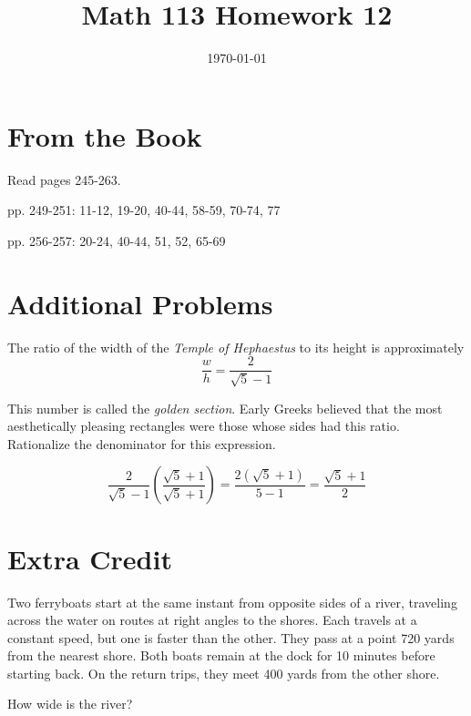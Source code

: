 \documentclass[fleqn,addpoints]{exam}
\title{Math 113 Homework 12}
\author{}
\date{\today}
\begin{document}
\maketitle

\section{From the Book}

Read pages 245-263.

\begin{itemize*}
  \item pp. 249-251: 11-12, 19-20, 40-44, 58-59, 70-74, 77
  \item pp. 256-257: 20-24, 40-44, 51, 52, 65-69
\end{itemize*}


\section{Additional Problems}

The ratio of the width of the {\em Temple of Hephaestus} to its height is approximately
\[
  \dfrac{w}{h} = \dfrac{2}{\sqrt{5} - 1}
\]

This number is called the {\em golden section}.  Early Greeks believed that the most aesthetically pleasing rectangles
were those whose sides had this ratio.  Rationalize the denominator for this expression.

\begin{solution}
\[
  \frac{2}{\sqrt{5} - 1} \left( \frac{\sqrt{5} + 1}{\sqrt{5} + 1} \right) = \frac{2(\sqrt{5} + 1)}{5-1} = \frac{\sqrt{5} + 1}{2}
\]

\end{solution}

\section{Extra Credit}

Two ferryboats start at the same instant from opposite sides of a river, traveling across the water on routes at right
angles to the shores.  Each travels at a constant speed, but one is faster than the other.  They pass at a point 720
yards from the nearest shore.  Both boats remain at the dock for 10 minutes before starting back.  On the return trips,
they meet 400 yards from the other shore.

How wide is the river?
\end{document}
